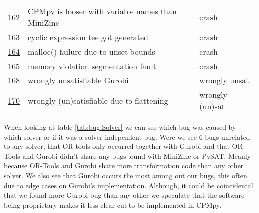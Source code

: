 \begin{table}[]
\begin{tabular}{lll}
		\href{https://github.com/CPMpy/cpmpy/issues/162}{162} & CPMpy is looser with variable names than MiniZinc & crash           \\
		\href{https://github.com/CPMpy/cpmpy/issues/163}{163} & cyclic expression tee got generated               & crash           \\
		\href{https://github.com/CPMpy/cpmpy/issues/164}{164} & malloc() failure due to unset bounds              & crash           \\
		\href{https://github.com/CPMpy/cpmpy/issues/165}{165} & memory violation segmentation fault               & crash           \\
		\href{https://github.com/CPMpy/cpmpy/issues/168}{168} & wrongly unsatisfiable Gurobi                      & wrongly unsat   \\
		\href{https://github.com/CPMpy/cpmpy/issues/170}{170} & wrongly (un)satisfiable due to flattening         & wrongly (un)sat \\ \bottomrule
	\end{tabular}
\end{table}

When looking at table \ref{tab:bug:Solver} we can see which bug was caused by which solver or if it was a solver independent bug. Were we see 6 bugs unrelated to any solver, that OR-tools only occurred together with Gurobi and that OR-Tools and Gurobi didn't share any bugs found with MiniZinc or PySAT. Meanly because OR-Tools and Gurobi share more transformation code than any other solver. We also see that Gurobi occurs the most among out our bugs, this often due to edge cases on Gurobi's implementation. Although, it could be coincidental that we found more Gurobi bug than any other we speculate that the software being proprietary makes it less clear-cut to be implemented in CPMpy.

